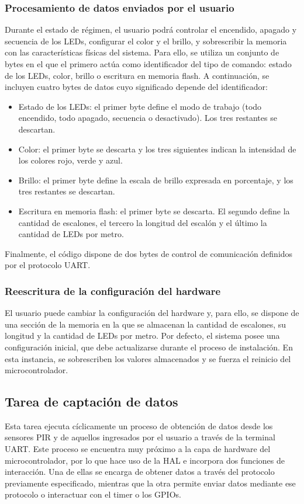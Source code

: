 \subsubsection{Procesamiento de datos enviados por el usuario}
Durante el estado de régimen, el usuario podrá controlar el encendido, apagado y secuencia de los LEDs, configurar el color y el brillo, y sobrescribir la memoria con las características físicas del sistema. Para ello, se utiliza un conjunto de bytes en el que el primero actúa como identificador del tipo de comando: estado de los LEDs, color, brillo o escritura en memoria flash. A continuación, se incluyen cuatro bytes de datos cuyo significado depende del identificador:
\begin{itemize}
    \item {Estado de los LEDs}: el primer byte define el modo de trabajo (todo encendido, todo apagado, secuencia o desactivado). Los tres restantes se descartan. 
    \item {Color}: el primer byte se descarta y los tres siguientes indican la intensidad de los colores rojo, verde y azul.
    \item {Brillo}: el primer byte define la escala de brillo expresada en porcentaje, y los tres restantes se descartan.
    \item {Escritura en memoria flash}: el primer byte se descarta. El segundo define la cantidad de escalones, el tercero la longitud del escalón y el último la cantidad de LEDs por metro.
\end{itemize}
Finalmente, el código dispone de dos bytes de control de comunicación definidos por el protocolo UART.

\subsubsection{Reescritura de la configuración del hardware}
El usuario puede cambiar la configuración del hardware y, para ello, se dispone de una sección de la memoria en la que se almacenan la cantidad de escalones, su longitud y la cantidad de LEDs por metro. Por defecto, el sistema posee una configuración inicial, que debe actualizarse durante el proceso de instalación. En esta instancia, se sobrescriben los valores almacenados y se fuerza el reinicio del microcontrolador.

\subsection{Tarea de captación de datos}
Esta tarea ejecuta cíclicamente un proceso de obtención de datos desde los sensores PIR y de aquellos ingresados por el usuario a través de la terminal UART. Este proceso se encuentra muy próximo a la capa de hardware del microcontrolador, por lo que hace uso de la HAL e incorpora dos funciones de interacción. Una de ellas se encarga de obtener datos a través del protocolo previamente especificado, mientras que la otra permite enviar datos mediante ese protocolo o interactuar con el timer o los GPIOs.

